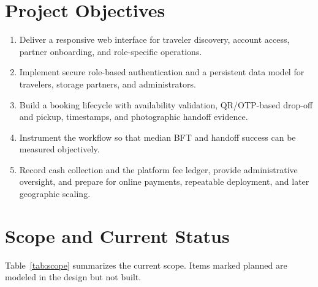 \documentclass{tietreport}
\begin{document}
\section{Project Objectives}
\begin{enumerate}[leftmargin=*]
  \item Deliver a responsive web interface for traveler discovery, account access, partner onboarding, and role-specific operations.
  \item Implement secure role-based authentication and a persistent data model for travelers, storage partners, and administrators.
  \item Build a booking lifecycle with availability validation, QR/OTP-based drop-off and pickup, timestamps, and photographic handoff evidence.
  \item Instrument the workflow so that median BFT and handoff success can be measured objectively.
  \item Record cash collection and the platform fee ledger, provide administrative oversight, and prepare for online payments, repeatable deployment, and later geographic scaling.
\end{enumerate}

\section{Scope and Current Status}
Table~\ref{tab:scope} summarizes the current scope. Items marked planned are modeled in the design but not built.
\end{document}

